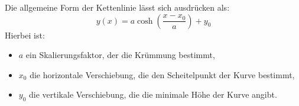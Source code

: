 Die allgemeine Form der Kettenlinie lässt sich ausdrücken als:
\[
	y(x)
	=
	a \cosh\left(\frac{x - x_0}{a}\right) + y_0
\]
Hierbei ist:

\begin{itemize}
	\item \(a\) ein Skalierungsfaktor, der die Krümmung bestimmt,
	\item \(x_0\) die horizontale Verschiebung, die den Scheitelpunkt der Kurve bestimmt,
	\item \(y_0\) die vertikale Verschiebung, die die minimale Höhe der Kurve angibt.
\end{itemize}
